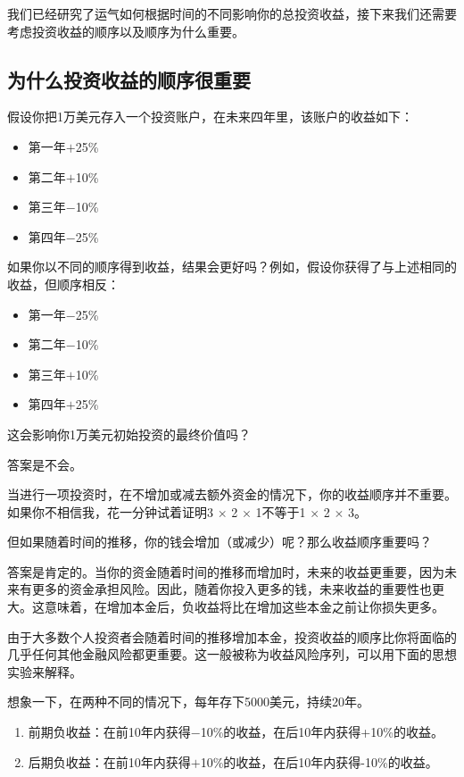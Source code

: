 我们已经研究了运气如何根据时间的不同影响你的总投资收益，接下来我们还需要考虑投资收益的顺序以及顺序为什么重要。

\subsection{为什么投资收益的顺序很重要}
假设你把1万美元存入一个投资账户，在未来四年里，该账户的收益如下：

\begin{itemize}
\item 第一年$+$25\%
\item 第二年$+$10\%
\item 第三年$-$10\%
\item 第四年$-$25\%
\end{itemize}

如果你以不同的顺序得到收益，结果会更好吗？例如，假设你获得了与上述相同的收益，但顺序相反：

\begin{itemize}
\item 第一年$-$25\%
\item 第二年$-$10\%
\item 第三年$+$10\%
\item 第四年$+$25\%
\end{itemize}

这会影响你1万美元初始投资的最终价值吗？

答案是不会。

当进行一项投资时，在不增加或减去额外资金的情况下，你的收益顺序并不重要。如果你不相信我，花一分钟试着证明3 $\times$ 2 $\times$ 1不等于1 $\times$ 2 $\times$ 3。

但如果随着时间的推移，你的钱会增加（或减少）呢？那么收益顺序重要吗？

答案是肯定的。当你的资金随着时间的推移而增加时，未来的收益更重要，因为未来有更多的资金承担风险。因此，随着你投入更多的钱，未来收益的重要性也更大。这意味着，在增加本金后，负收益将比在增加这些本金之前让你损失更多。

由于大多数个人投资者会随着时间的推移增加本金，投资收益的顺序比你将面临的几乎任何其他金融风险都更重要。这一般被称为收益风险序列，可以用下面的思想实验来解释。

想象一下，在两种不同的情况下，每年存下5000美元，持续20年。

\begin{enumerate}
\item 前期负收益：在前10年内获得$-$10\%的收益，在后10年内获得+10\%的收益。
\item 后期负收益：在前10年内获得$+$10\%的收益，在后10年内获得-10\%的收益。
\end{enumerate}

